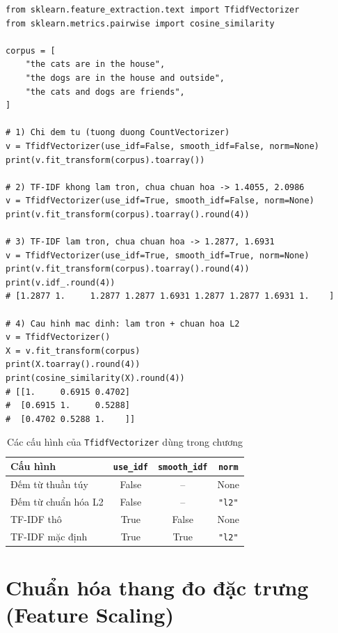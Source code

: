 \begin{lstlisting}[caption={TF-IDF Vectorizer với các cấu hình khác nhau}]
from sklearn.feature_extraction.text import TfidfVectorizer
from sklearn.metrics.pairwise import cosine_similarity

corpus = [
    "the cats are in the house",
    "the dogs are in the house and outside",
    "the cats and dogs are friends",
]

# 1) Chi dem tu (tuong duong CountVectorizer)
v = TfidfVectorizer(use_idf=False, smooth_idf=False, norm=None)
print(v.fit_transform(corpus).toarray())

# 2) TF-IDF khong lam tron, chua chuan hoa -> 1.4055, 2.0986
v = TfidfVectorizer(use_idf=True, smooth_idf=False, norm=None)
print(v.fit_transform(corpus).toarray().round(4))

# 3) TF-IDF lam tron, chua chuan hoa -> 1.2877, 1.6931
v = TfidfVectorizer(use_idf=True, smooth_idf=True, norm=None)
print(v.fit_transform(corpus).toarray().round(4))
print(v.idf_.round(4))
# [1.2877 1.     1.2877 1.2877 1.6931 1.2877 1.2877 1.6931 1.    ]

# 4) Cau hinh mac dinh: lam tron + chuan hoa L2
v = TfidfVectorizer()
X = v.fit_transform(corpus)
print(X.toarray().round(4))
print(cosine_similarity(X).round(4))
# [[1.     0.6915 0.4702]
#  [0.6915 1.     0.5288]
#  [0.4702 0.5288 1.    ]]
\end{lstlisting}

\begin{table}[H]
\centering
\begin{tabular}{|l|c|c|c|}
\hline
\textbf{Cấu hình} & \texttt{use\_idf} & \texttt{smooth\_idf} & \texttt{norm} \\
\hline
Đếm từ thuần túy & False & -- & None \\ \hline
Đếm từ chuẩn hóa L2 & False & -- & \texttt{"l2"} \\ \hline
TF-IDF thô & True & False & None \\ \hline
TF-IDF mặc định & True & True & \texttt{"l2"} \\ \hline
\end{tabular}
\caption{Các cấu hình của \texttt{TfidfVectorizer} dùng trong chương}
\end{table}

\section{Chuẩn hóa thang đo đặc trưng (Feature Scaling)}
\label{sec:scaling}

